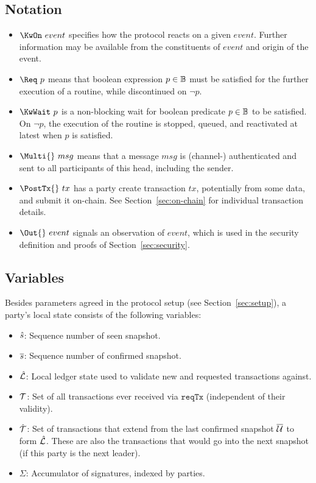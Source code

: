 \subsection{Notation}
\begin{itemize}
  \item $\KwOn~event$ specifies how the protocol reacts on a given $event$.
        Further information may be available from the constituents of $event$
        and origin of the event.
  \item $\Req~p$ means that boolean expression $p \in \mathbb{B}$ must be satisfied
        for the further execution of a routine, while discontinued on $\neg p$.
  \item $\KwWait~p$ is a  non-blocking wait for boolean
        predicate $p \in \mathbb{B}$ to be satisfied. On $\neg p$, the execution of
        the routine is stopped, queued, and reactivated at latest when $p$ is
        satisfied.
  \item $\Multi{}~msg$ means that a message $msg$ is (channel-) authenticated
        and sent to all participants of this head, including the sender.
  \item $\PostTx{}~tx$ has a party create transaction $tx$, potentially from
        some data, and submit it on-chain. See Section~\ref{sec:on-chain} for
        individual transaction details. 
  \item $\Out{}~event$ signals an observation of $event$, which is used in the
        security definition and proofs of Section~\ref{sec:security}.
\end{itemize}

\subsection{Variables}

Besides parameters agreed in the protocol setup (see Section~\ref{sec:setup}), a
party's local state consists of the following variables:

\begin{itemize}
  \item $\hat s$: Sequence number of seen snapshot.
  \item $\overline s$: Sequence number of confirmed snapshot.
  \item $\hat {\mathcal L}$: Local ledger state used to validate new and requested
        transactions against.
  \item ${\mathcal T}$: Set of all transactions ever received via $\mathtt{reqTx}$
        (independent of their validity).
  \item $\hat {\mathcal T}$: Set of transactions that extend from the last confirmed
        snapshot $\overline {\mathcal U}$ to form $\hat {\mathcal L}$. These are also the transactions that
        would go into the next snapshot (if this party is the next leader).
  \item $\Sigma$: Accumulator of signatures, indexed by parties.
\end{itemize}

